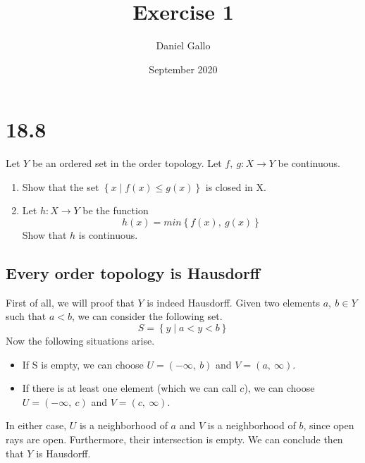 \documentclass{article}
\title{Exercise 1}
\author{Daniel Gallo}
\date{September 2020}
\begin{document}
\maketitle
\section*{18.8}
Let $Y$ be an ordered set in the order topology. Let $f,\ g \colon X \rightarrow Y$ be continuous.
\begin{enumerate}
    \item Show that the set $\left\{x \mid f(x) \leq g(x)\right\}$ is closed in X.
    \item Let $h\colon X \rightarrow Y$ be the function
    \begin{equation*}
        h(x) = min\left\{f(x),\ g(x)\right\}
    \end{equation*}
    Show that $h$ is continuous.
\end{enumerate}
\subsection*{Every order topology is Hausdorff}
First of all, we will proof that $Y$ is indeed Hausdorff. Given two elements $a,\ b \in Y$ such that $a < b$, we can consider the following set.
\begin{equation*}
    S = \left\{y \mid a < y < b\right\}
\end{equation*}
Now the following situations arise.
\begin{itemize}
    \item If S is empty, we can choose $U = \left(-\infty,\ b\right)$ and $V = \left(a,\ \infty\right)$.
    \item If there is at least one element (which we can call $c$), we can choose $U = \left(-\infty,\ c\right)$ and $V = \left(c,\ \infty\right)$.
\end{itemize}
In either case, $U$ is a neighborhood of $a$ and $V$ is a neighborhood of $b$, since open rays are open. Furthermore, their intersection is empty. We can conclude then that $Y$ is Hausdorff.
\end{document}
